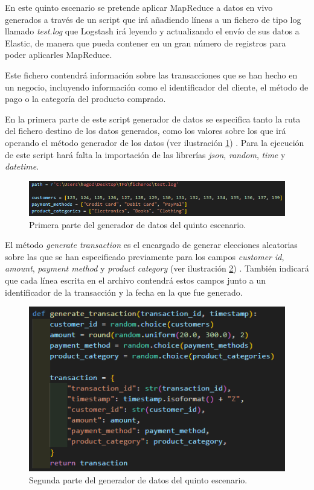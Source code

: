 En este quinto escenario se pretende aplicar MapReduce a datos en vivo generados a través de un script que irá añadiendo líneas a un fichero de tipo log llamado \textit{test.log} que Logstash irá leyendo y actualizando el envío de sus datos a Elastic, de manera que pueda contener en un gran número de registros para poder aplicarles MapReduce.

Este fichero contendrá información sobre las transacciones que se han hecho en un negocio, incluyendo información como el identificador del cliente, el método de pago o la categoría del producto comprado.

En la primera parte de este script generador de datos se especifica tanto la ruta del fichero destino de los datos generados, como los valores sobre los que irá operando el método generador de los datos (ver ilustración \ref{fig:generador1}) . Para la ejecución de este script hará falta la importación de las librerías \textit{json}, \textit{random}, \textit{time} y \textit{datetime}.
\begin{figure}
    \centering
    \includegraphics[width=1\linewidth]{img/escenario51.png}
    \caption{Primera parte del generador de datos del quinto escenario.}
    \label{fig:generador1}
\end{figure}

El método \textit{generate transaction} es el encargado de generar elecciones aleatorias sobre las que se han especificado previamente para los campos \textit{customer id}, \textit{amount}, \textit{payment method} y \textit{product category} (ver ilustración \ref{fig:generador2}) . También indicará que cada línea escrita en el archivo contendrá estos campos junto a un identificador de la transacción y la fecha en la que fue generado.
\begin{figure}
    \centering
    \includegraphics[width=1\linewidth]{img/escenario52.png}
    \caption{Segunda parte del generador de datos del quinto escenario.}
    \label{fig:generador2}
\end{figure}


